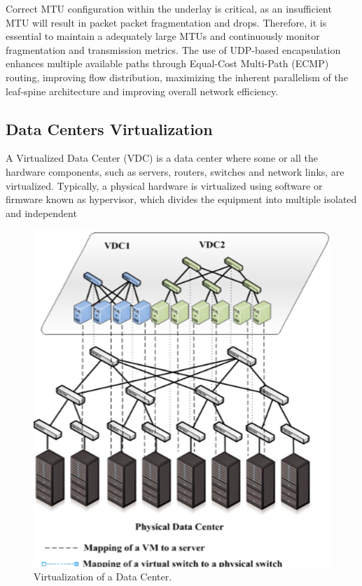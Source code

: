 Correct MTU configuration within the underlay is critical, as an insufficient MTU will result in packet packet fragmentation and drops. Therefore, it is essential to maintain a adequately large MTUs and continuously monitor fragmentation and transmission metrics. The use of UDP-based encapsulation enhances multiple available paths through Equal-Cost Multi-Path (ECMP) routing, improving flow distribution, maximizing the inherent parallelism of the leaf-spine architecture and improving overall network efficiency. \par

\subsection{Data Centers Virtualization}

A Virtualized Data Center (VDC) is a data center where some or all the hardware components, such as servers, routers, switches and network links, are virtualized. Typically, a physical hardware is virtualized using software or firmware known as hypervisor, which divides the equipment into multiple isolated and independent  

\begin{figure}
    \centering
    \vspace{-10pt}
    \includegraphics[width=0.8\linewidth]{Figures/virtualization.png}
    \caption{Virtualization of a Data Center.}
    \label{virtualization}
    \vspace{-10pt}
\end{figure}

